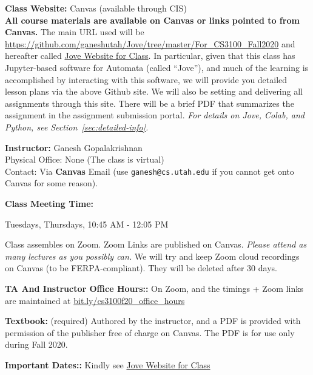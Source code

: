 \documentclass[12pt]{article}
\newcommand{\para}[1]{{\vspace{4pt}\noindent\bf{#1:}}}
\begin{document}
\para{Class Website} Canvas (available through CIS)\\
\noindent\textbf{All course materials are available on Canvas or links pointed to from Canvas.}
The main URL used will be
\url{https://github.com/ganeshutah/Jove/tree/master/For_CS3100_Fall2020}
and hereafter called \href{https://github.com/ganeshutah/Jove/tree/master/For_CS3100_Fall2020}{Jove Website for Class}.
%
In particular, given that this class has Jupyter-based software for Automata
(called ``Jove''), and much of the learning is accomplished by interacting
with this software, we will
provide you detailed lesson plans via the above Github site.
%
We will also be setting and delivering all assignments through this site.
%
There will be a brief PDF that summarizes the assignment in the assignment
submission portal.
%
{\em For details on Jove, Colab, and Python, see Section~\ref{sec:detailed-info}.}



\para{Instructor} Ganesh Gopalakrishnan \\
\indent Physical Office: None (The class is virtual) \\
\indent Contact:  Via {\bf Canvas} Email
(use {\tt ganesh@cs.utah.edu} if you cannot get onto Canvas for some reason).

\para{Class Meeting Time} 
\begin{compactitem}
\item Tuesdays, Thursdays, 10:45 AM - 12:05 PM
\item[] Class assembles on Zoom. Zoom Links are published on Canvas.
  {\em Please attend as many lectures as you possibly can.}
  We will try and keep Zoom cloud recordings on Canvas
  (to be FERPA-compliant).
  They will be deleted after 30 days.
\end{compactitem}

\para{TA And Instructor Office Hours:}
On Zoom, and the timings + Zoom links are maintained
at \url{bit.ly/cs3100f20_office_hours}


\para{Textbook} (required) Authored by the instructor,
and a PDF is provided with permission of the publisher free
of charge on Canvas. The PDF is for use only during Fall 2020.


\para{Important Dates:\/} Kindly see \href{https://github.com/ganeshutah/Jove/tree/master/For_CS3100_Fall2020}{Jove Website for Class}
\end{document}
